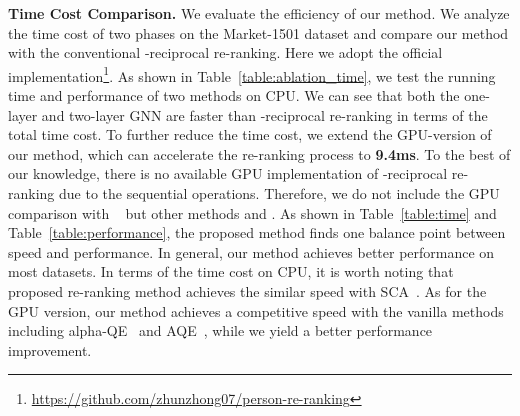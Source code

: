\documentclass[10pt,twocolumn,letterpaper]{article}
\begin{document}
\noindent\textbf{Time Cost Comparison.}  \label{sec:time cost}
We evaluate the efficiency of our method. We analyze the time cost of two phases on the Market-1501 dataset and compare our method with the conventional -reciprocal re-ranking. Here we adopt the official implementation\footnote{\tiny\url{https://github.com/zhunzhong07/person-re-ranking}}.
As shown in Table~\ref{table:ablation_time}, we test the running time and performance of two methods on CPU. 
We can see that both the one-layer and two-layer GNN are faster than  -reciprocal re-ranking in terms of the total time cost.
To further reduce the time cost, we extend the GPU-version of our method, which can accelerate the re-ranking process to \textbf{9.4ms}. To the best of our knowledge, there is no available GPU implementation of -reciprocal re-ranking due to the sequential operations. Therefore, we do not include the GPU comparison with ~\cite{zhong2017re} but other methods \cite{chum2007total} and \cite{radenovic2018fine}. As shown in Table~\ref{table:time}  and  Table~\ref{table:performance}, the proposed method finds one balance point between speed and performance. 
In general, our method achieves better performance on most datasets. 
In terms of the time cost on CPU, it is worth noting that proposed re-ranking method achieves the similar speed with SCA~\cite{bai2016sparse}.
As for the GPU version, our method achieves 
a competitive speed with the vanilla methods including alpha-QE~\cite{radenovic2018fine} and AQE~\cite{chum2007total}, while we yield a better performance improvement.
\end{document}
